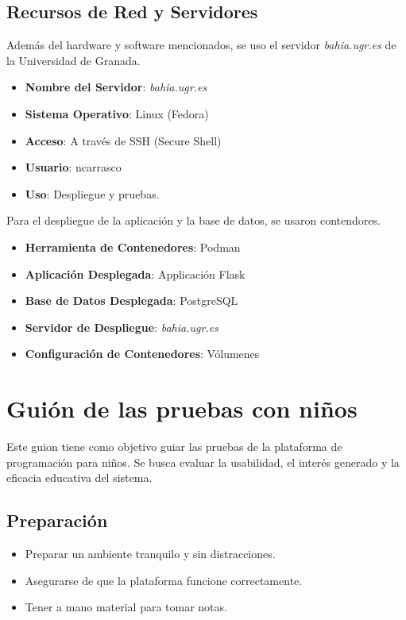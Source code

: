 \begin{appendices}
\section{Recursos de Red y Servidores}

Además del hardware y software mencionados, se uso el servidor \textit{bahia.ugr.es} de la Universidad de Granada.

\begin{itemize}
    \item \textbf{Nombre del Servidor}: \textit{bahia.ugr.es}
    \item \textbf{Sistema Operativo}: Linux (Fedora)
    \item \textbf{Acceso}: A través de SSH (Secure Shell)
    \item \textbf{Usuario}: ncarrasco
    \item \textbf{Uso}: Despliegue y pruebas.
\end{itemize}

Para el despliegue de la aplicación y la base de datos, se usaron contendores. 

\begin{itemize}
    \item \textbf{Herramienta de Contenedores}: Podman
    \item \textbf{Aplicación Desplegada}: Applicación Flask
    \item \textbf{Base de Datos Desplegada}: PostgreSQL
    \item \textbf{Servidor de Despliegue}: \textit{bahia.ugr.es}
    \item \textbf{Configuración de Contenedores}: Vólumenes
\end{itemize}


\chapter{Guión de las pruebas con niños}

Este guion tiene como objetivo guiar las pruebas de la plataforma de programación para niños. Se busca evaluar la usabilidad, el interés generado y la eficacia educativa del sistema.

\section{Preparación}
\begin{itemize}
    \item Preparar un ambiente tranquilo y sin distracciones.
    \item Asegurarse de que la plataforma funcione correctamente.
    \item Tener a mano material para tomar notas.
\end{itemize}


\end{appendices}
